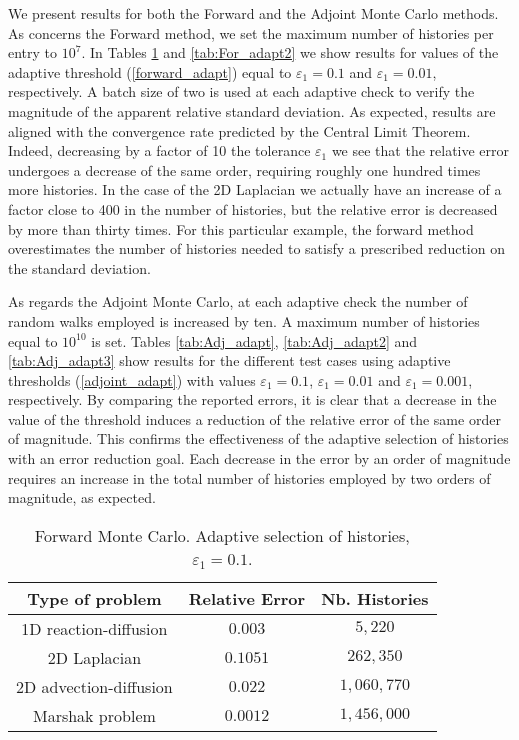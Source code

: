 \documentclass[final,leqno,onefignum,onetabnum]{siamltex1213}
\begin{document}
We present results for both the Forward
and the Adjoint Monte Carlo methods.
As concerns the Forward method, we set the maximum number of
histories per entry to $10^7$. In Tables \ref{tab:For_adapt} and \ref{tab:For_adapt2} 
we show results for values of the adaptive threshold
(\ref{forward_adapt}) equal to
$\varepsilon_1=0.1$ and $\varepsilon_1=0.01$, respectively.
A batch size of two is used at each
adaptive check to verify the magnitude of the apparent relative standard
deviation. As expected, results are aligned with the convergence rate predicted
by the Central Limit Theorem. Indeed, decreasing by a factor of 10 the
tolerance $\varepsilon_1$ we see that the relative error undergoes a
decrease of the same order, requiring roughly
one hundred times more histories. In the case of the 2D Laplacian we actually
have an increase of a factor close to 400 in the number of histories, but the
relative error is decreased by more than thirty times. For this particular
example, the forward method overestimates the number of histories
needed to satisfy a prescribed reduction on the standard deviation.

As regards the Adjoint Monte Carlo, at each adaptive check the number of
random walks employed is increased by ten.
A maximum number of histories equal to $10^{10}$ is set.
Tables \ref{tab:Adj_adapt}, \ref{tab:Adj_adapt2} and
\ref{tab:Adj_adapt3} show results
for the different test cases using adaptive thresholds (\ref{adjoint_adapt})
with values $\varepsilon_1=0.1$, $\varepsilon_1=0.01$ and
$\varepsilon_1=0.001$, respectively.
By comparing the reported errors, it is
clear that a decrease in the value of the threshold
induces a reduction of the relative error of the same order of magnitude.
This confirms
the effectiveness of the adaptive selection of histories with an error
reduction goal. Each decrease in the error by an order of magnitude
requires an increase in the total number of histories employed by
two orders of magnitude, as expected.

\begin{table}[!t]
\centering
\begin{tabular}{|c|c|c|}
\hline
\textbf{Type of problem} & \textbf{Relative Error} &\textbf{Nb. Histories}\\
\hline
1D reaction-diffusion & $0.003$ & $5,220$\\
\hline
2D Laplacian & $0.1051$ & $262,350$\\
\hline
2D advection-diffusion & $0.022$  & $1,060,770$\\
\hline
Marshak problem & $0.0012$ & $1,456,000$\\
\hline
\end{tabular}
\caption{Forward Monte Carlo. Adaptive selection of histories,
$\varepsilon_1=0.1$.}
\label{tab:For_adapt}
\end{table}
\end{document}
